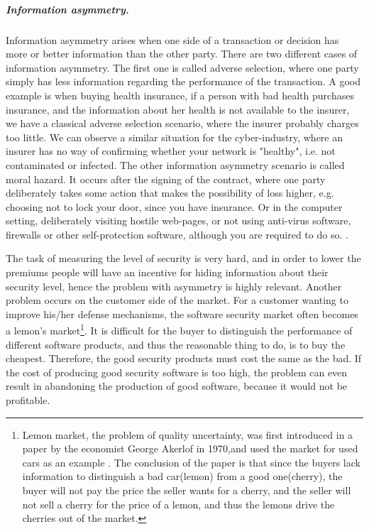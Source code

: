 \subparagraph{Information asymmetry.}
Information asymmetry arises when one side of a transaction or decision has more or better information than the other party. There are two different cases of information asymmetry. The first one is called adverse selection, where one party simply has less information regarding the performance of the transaction. A good example is when buying health insurance, if a person with bad health purchases insurance, and the information about her health is not available to the insurer, we have a classical adverse selection scenario, where the insurer probably charges too little. We can observe a similar situation for the cyber-industry, where an insurer has no way of confirming whether your network is "healthy", i.e. not contaminated or infected. 
The other information asymmetry scenario is called moral hazard. It occurs after the signing of the contract, where one party deliberately takes some action that makes the possibility of loss higher, e.g. choosing not to lock your door, since you have insurance. Or in the computer setting, deliberately visiting hostile web-pages, or not using anti-virus software, firewalls or other self-protection software, although you are required to do so. \cite{solutiontoinfoasym}.
    
    
The task of measuring the level of security is very hard, and in order to lower the premiums people will have an incentive for hiding information about their security level, hence the problem with asymmetry is highly relevant. Another problem occurs on the customer side of the market. For a customer wanting to improve his/her defense mechanisms, the software security market often becomes a lemon's market\footnote{Lemon market, the problem of quality uncertainty, was first introduced in a paper \cite{lemonpaper} by the economist George Akerlof in 1970,and used the market for used cars as an example \cite{lemon}. The conclusion of the paper is that since the buyers lack information to distinguish a bad car(lemon) from a good one(cherry), the buyer will not pay the price the seller wants for a cherry, and the seller will not sell a cherry for the price of a lemon, and thus the lemons drive the cherries out of the market.}. 
It is difficult for the buyer to distinguish the performance of different software products, and thus the reasonable thing to do, is to buy the cheapest. Therefore, the good security products must cost the same as the bad. If the cost of producing good security software is too high, the problem can even result in abandoning the production of good software, because it would not be profitable.

